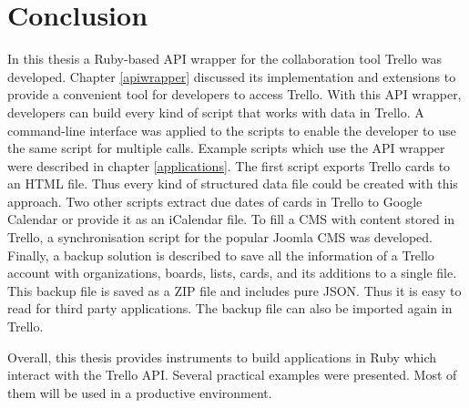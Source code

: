 \onehalfspacing
\chapter{Conclusion}
  \label{Conclusion}

In this thesis a Ruby-based API wrapper for the collaboration tool Trello was developed. Chapter \ref{apiwrapper} discussed its implementation and extensions to provide a convenient tool for developers to access Trello. With this API wrapper, developers can build every kind of script that works with data in Trello. A command-line interface was applied to the scripts to enable the developer to use the same script for multiple calls. Example scripts which use the API wrapper were described in chapter \ref{applications}. The first script exports Trello cards to an HTML file. Thus every kind of structured data file could be created with this approach. Two other scripts extract due dates of cards in Trello to Google Calendar or provide it as an iCalendar file. To fill a CMS with content stored in Trello, a synchronisation script for the popular Joomla CMS was developed. Finally, a backup solution is described to save all the information of a Trello account with organizations, boards, lists, cards, and its additions to a single file. This backup file is saved as a ZIP file and includes pure JSON. Thus it is easy to read for third party applications. The backup file can also be imported again in Trello. 

Overall, this thesis provides instruments to build applications in Ruby which interact with the Trello API. Several practical examples were presented. Most of them will be used in a productive environment.